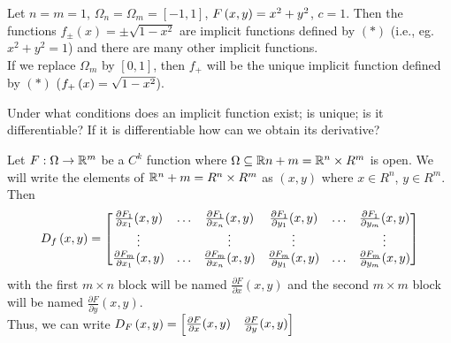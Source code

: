 \begin{example}
    Let $n = m = 1$, $\Omega_n = \Omega_m = [-1, 1]$, $F\left(x,y\right) = x^2 + y^2$, $c = 1$. Then the functions $f_\pm (x) = \pm\sqrt{1 - x^2}$ are implicit functions defined by $(*)$ (i.e., eg. $x^2 + y^2 = 1$) and there are many other implicit functions. \\
    If we replace $\Omega_m$ by $[0,1]$, then $f_+$ will be the unique implicit function defined by $(*)$ ($f_+\left(x\right) = \sqrt{1 - x^2}$).
\end{example}

\begin{question}
    Under what conditions does an implicit function exist; is unique; is it differentiable? If it is differentiable how can we obtain its derivative?
\end{question}

\begin{note}
    Let $F: \Omega \to \mathbb{R}^m$ be a $C^k$ function where $\Omega \subseteq \mathbb{R}{n + m} = \mathbb{R}^n \times R^m$ is open. We will write the elements of $\mathbb{R}^n + m = R^n \times R^m$ as $(x,y)$ where $x \in R^n$, $y \in R^m$. Then
    $$D_f\left(x,y\right) = \begin{bmatrix}
        \frac{\partial F_1}{\partial x_1}(x,y) & \dots & \frac{\partial F_1}{\partial x_n}(x,y) & \frac{\partial F_1}{\partial y_1}(x,y) & \dots & \frac{\partial F_1}{\partial y_m}(x,y) \\
        \vdots & & \vdots & \vdots & & \vdots \\
        \frac{\partial F_m}{\partial x_1}(x,y) & \dots & \frac{\partial F_m}{\partial x_n}(x,y) & \frac{\partial F_m}{\partial y_1}(x,y) & \dots & \frac{\partial F_m}{\partial y_m}(x,y)
    \end{bmatrix}$$ with the first $m \times n$ block will be named $\frac{\partial F}{\partial x}(x,y)$ and the second $m \times m$ block will be named $\frac{\partial F}{\partial y}(x,y)$. \\
    Thus, we can write $D_F\left(x,y\right) = \begin{bmatrix} \frac{\partial F}{\partial x}(x,y) & \frac{\partial F}{\partial y}(x,y) \end{bmatrix}$
\end{note}

